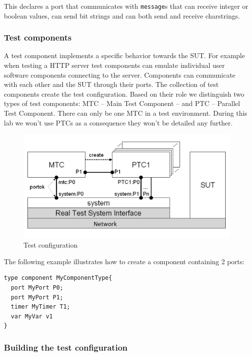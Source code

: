 \documentclass[a4paper]{article}
\begin{document}
This declares a port that communicates with \verb/message/s that can receive integer or boolean values,
can send bit strings and can both send and receive charstrings.

\subsubsection{Test components}
A test component implements a specific behavior towards the SUT. For example when testing a HTTP server test components
can emulate individual user software components connecting to the server.
Components can communicate with each other and the SUT through their ports. The collection of test components create
the test configuration. Based on their role we distinguish two types of test components: MTC -- Main Test Component --
and PTC -- Parallel Test Component. There can only be one MTC in a test environment. During this lab we won't use PTCs
as a consequence they won't be detailed any further.

\begin{figure}[H]
    \centering
    \includegraphics[width=\textwidth]{figures/TC.png}
    \caption{Test configuration}
    \label{fig:tc}
\end{figure}

The following example illustrates how to create a component containing 2 ports:

{\footnotesize
\begin{lstlisting}
type component MyComponentType{
  port MyPort P0;
  port MyPort P1;
  timer MyTimer T1;
  var MyVar v1
}
\end{lstlisting}
}

\subsubsection{Building the test configuration}
\end{document}
